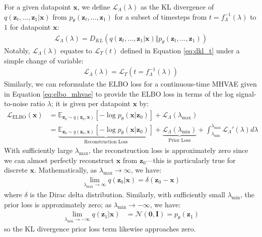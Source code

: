 \documentclass[ oneside,%
                    author={George Herbert},
                    degree={MSci},
                     title={Video Diffusion Models for Climate Simulations},
                  subtitle={}]{dissertation}
\begin{document}
For a given datapoint $\mathbf{x}$, we define $\mathcal{L}_\Lambda(\lambda)$ as the KL divergence of $q(\mathbf{z}_t,\ldots,\mathbf{z}_1|\mathbf{x})$ from $p_\theta(\mathbf{z}_t,\ldots,\mathbf{z}_1)$ for a subset of timesteps from $t=f_\Lambda^{-1}(\lambda)$ to $1$ for datapoint $\mathbf{x}$:
\begin{align}
      \mathcal{L}_\Lambda(\lambda)=D_{KL}(q(\mathbf{z}_t,\ldots,\mathbf{z}_1|\mathbf{x})\Vert p_\theta(\mathbf{z}_t,\ldots,\mathbf{z}_1))
\end{align}
Notably, $\mathcal{L}_\Lambda(\lambda)$ equates to $\mathcal{L}_T(t)$ defined in Equation \ref{eq:dkl_t} under a simple change of variable:
\begin{align}
      \mathcal{L}_\Lambda(\lambda)=\mathcal{L}_T(t=f_\Lambda^{-1}(\lambda))
\end{align}
Similarly, we can reformulate the ELBO loss for a continuous-time MHVAE given in Equation \ref{eq:elbo_mhvae} to provide the ELBO loss in terms of the log signal-to-noise ratio $\lambda$; it is given per datapoint $\mathbf{x}$ by:
\begin{align}
      \mathcal{L}_{\mathrm{ELBO}}(\mathbf{x})&=\mathbb{E}_{\mathbf{z}_0\sim q(\mathbf{z}_0,\mathbf{x})}\left[-\log p_\theta(\mathbf{x}|\mathbf{z}_0)\right]+\mathcal{L}_\Lambda(\lambda_{\max})\\
      &=\underbrace{\mathbb{E}_{\mathbf{z}_0\sim q(\mathbf{z}_0,\mathbf{x})}\left[-\log p_\theta(\mathbf{x}|\mathbf{z}_0)\right]}_{\text{Reconstruction Loss}}+\underbrace{\mathcal{L}_\Lambda(\lambda_{\min})}_{\text{Prior Loss}}+\int_{\lambda_{\min}}^{\lambda_{\max}}\mathcal{L}_\Lambda'(\lambda)d\lambda\label{eq:diffusion_elbo}
\end{align}
With sufficiently large $\lambda_{\max}$, the reconstruction loss is approximately zero since we can almost perfectly reconstruct $\mathbf{x}$ from $\mathbf{z}_0$---this is particularly true for discrete $\mathbf{x}$. Mathematically, as $\lambda_{\max}\to\infty$, we have:
\begin{align}
      \lim_{\lambda_{\max}\to\infty}q(\mathbf{z}_0|\mathbf{x})=\delta(\mathbf{z}_0-\mathbf{x})
\end{align}
where $\delta$ is the Dirac delta distribution. Similarly, with sufficiently small $\lambda_{\min}$, the prior loss is approximately zero; as $\lambda_{\min}\to-\infty$, we have:
\begin{align}
      \lim_{\lambda_{\min}\to -\infty} q(\mathbf{z}_1|\mathbf{x})&=\mathcal{N}(\mathbf{0}, \mathbf{I})=p_\theta(\mathbf{z}_1)
\end{align}
so the KL divergence prior loss term likewise approaches zero.
\end{document}
